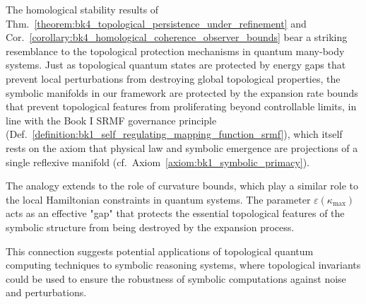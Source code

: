 \begin{remark}
\label{remark:bk4_quantum_topological_phases}
The homological stability results of Thm.~\ref{theorem:bk4_topological_persistence_under_refinement} and Cor.~\ref{corollary:bk4_homological_coherence_observer_bounds} bear a striking resemblance to the topological protection mechanisms in quantum many-body systems. Just as topological quantum states are protected by energy gaps that prevent local perturbations from destroying global topological properties, the symbolic manifolds in our framework are protected by the expansion rate bounds that prevent topological features from proliferating beyond controllable limits, in line with the Book I SRMF governance principle (Def.~\ref{definition:bk1_self_regulating_mapping_function_srmf}), which itself rests on the axiom that physical law and symbolic emergence are projections of a single reflexive manifold (cf.~Axiom~\ref{axiom:bk1_symbolic_primacy}).

The analogy extends to the role of curvature bounds, which play a similar role to the local Hamiltonian constraints in quantum systems. The parameter $\varepsilon(\kappa_{\max})$ acts as an effective "gap" that protects the essential topological features of the symbolic structure from being destroyed by the expansion process.

This connection suggests potential applications of topological quantum computing techniques to symbolic reasoning systems, where topological invariants could be used to ensure the robustness of symbolic computations against noise and perturbations.
\end{remark}

